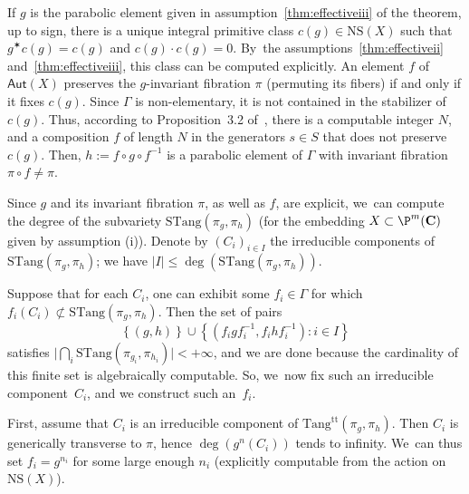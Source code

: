 \documentclass[JEP,XML,SOM,Unicode,published]{cedram}
\let\sep :
\newcommand{\set}[1]{\left\{#1\right\}}
\newcommand{\inv}{^{-1}}
\def\C{\mathbf{C}}
\newcommand{\NS}{{\mathrm{NS}}}
\newcommand{\Tang}{{\mathrm{Tang}}}
\newcommand{\STang}{{\mathrm{STang}}}
\newcommand\Aut{\mathsf{Aut}}
\theoremstyle{plain}
\theoremstyle{definition}
\begin{document}
If $g$ is the parabolic element given in assumption~\eqref{thm:effectiveiii} of the theorem, up to sign, there is a unique integral primitive class $c(g)\in \NS(X)$ such that $g^\varstar c(g)=c(g)$ and $c(g)\cdot c(g)=0$. By~the assumptions~\eqref{thm:effectiveii} and~\eqref{thm:effectiveiii}, this class can be computed explicitly. An element $f$ of $\Aut(X)$ preserves the $g$-invariant fibration $\pi$ (permuting its fibers) if and only if it fixes $c(g)$. Since $\Gamma$ is non-elementary, it is not contained in the stabilizer of $c(g)$. Thus, according to Proposition~3.2 of~\cite{eskin-mozes-oh}, there is a computable integer $N$, and a composition $f$ of length $N$ in the generators $s\in S$ that does not preserve $c(g)$. Then, $h:= f\circ g \circ f^{-1}$ is a parabolic element of $\Gamma$ with invariant fibration $\pi\circ f\neq \pi$.

Since $g$ and its invariant fibration $\pi$, as well as $f$, are explicit, we~can compute the degree of the subvariety
$\STang(\pi_g, \pi_h)$ (for the embedding $X\subset \P^m(\C)$ given by assumption (i)). Denote by $(C_i)_{i\in I}$ the irreducible components of $\STang(\pi_g, \pi_h)$; we have $\vert I\vert \leq \deg(\STang(\pi_g, \pi_h))$.

Suppose that for each $C_i$, one can exhibit some $f_i\in \Gamma$ for which $f_i(C_i)\not \subset \STang(\pi_g, \pi_h)$. Then the set of pairs
\begin{equation*}
\set{(g,h)} \cup \set{ (f_igf_i\inv, f_i h f_i\inv)\sep  i\in I}
\end{equation*}
satisfies $\vert \bigcap_i\STang(\pi_{g_i}, \pi_{h_i})\vert < +\infty$, and we are done because the cardinality of this finite set is algebraically computable.
So, we~now fix such an irreducible component~$C_i$, and we construct such an~$f_i$.

First, assume that $C_i$ is an irreducible component of $\Tang^{\mathrm{tt}}(\pi_g, \pi_h)$. Then $C_i$ is generically transverse to $\pi$, hence $\deg(g^n(C_i))$ tends to infinity. We~can thus set \hbox{$f_i=g^{n_i}$} for some large enough $n_i$ (explicitly computable from the action on $\NS(X)$).
\end{document}
